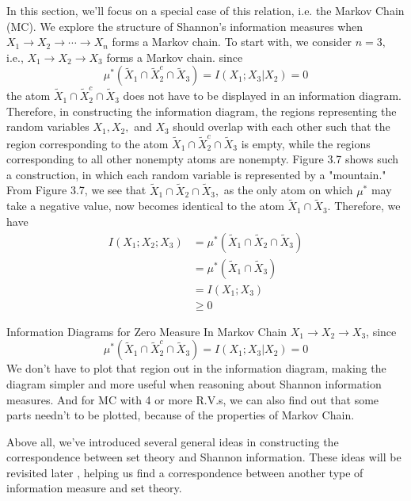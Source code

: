 In this section, we'll focus on a special case of this relation, i.e. the Markov Chain (MC). We explore the structure of Shannon's information measures when $X_{1} \rightarrow X_{2} \rightarrow \cdots \rightarrow X_{n}$ forms a Markov chain. To start with, we consider $n=3,$ i.e., $X_{1} \rightarrow X_{2} \rightarrow X_{3}$ forms a Markov chain. since
\[
\mu^{*}\left(\tilde{X}_{1} \cap \tilde{X}_{2}^{c} \cap \tilde{X}_{3}\right)=I\left(X_{1} ; X_{3} | X_{2}\right)=0
\]
the atom $\tilde{X}_{1} \cap \tilde{X}_{2}^{c} \cap \tilde{X}_{3}$ does not have to be displayed in an information diagram. Therefore, in constructing the information diagram, the regions representing the random variables $X_{1}, X_{2},$ and $X_{3}$ should overlap with each other such that the region corresponding to the atom $\tilde{X}_{1} \cap \tilde{X}_{2}^{c} \cap \tilde{X}_{3}$ is empty, while the regions corresponding to all other nonempty atoms are nonempty. Figure 3.7 shows such a construction, in which each random variable is represented by a "mountain." From Figure 3.7, we see that $\tilde{X}_{1} \cap \tilde{X}_{2} \cap \tilde{X}_{3},$ as the only atom on which $\mu^{*}$ may take a negative value, now becomes identical to the atom $\tilde{X}_{1} \cap \tilde{X}_{3} .$ Therefore, we have
\[
\begin{aligned}
I\left(X_{1} ; X_{2} ; X_{3}\right) &=\mu^{*}\left(\tilde{X}_{1} \cap \tilde{X}_{2} \cap \tilde{X}_{3}\right) \\
&=\mu^{*}\left(\tilde{X}_{1} \cap \tilde{X}_{3}\right) \\
&=I\left(X_{1} ; X_{3}\right) \\
& \geq 0
\end{aligned}
\]




 Information Diagrams for Zero Measure
In Markov Chain $X_{1} \rightarrow X_{2} \rightarrow X_{3}$, since \begin{equation}\mu^{*}\left(\tilde{X}_{1} \cap \tilde{X}_{2}^{c} \cap \tilde{X}_{3}\right)=I\left(X_{1} ; X_{3} | X_{2}\right)=0\end{equation}
        We don't have to plot that region out in the information diagram, making the diagram simpler and more useful when reasoning about Shannon information measures. And for MC with 4 or more R.V.s, we can also find out that some parts needn't to be plotted, because of the properties of Markov Chain.


Above all, we've introduced several general ideas in constructing the correspondence between set theory and Shannon information. These ideas will be revisited later , helping us find a correspondence between another type of information measure and set theory.

